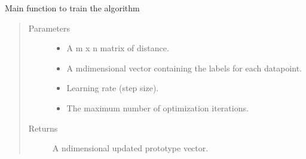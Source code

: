 \documentclass[letterpaper,10pt,english]{sphinxmanual}
\begin{document}
\begin{fulllineitems}
\begin{fulllineitems}
\begin{quote}
\begin{description}
\end{description}\end{quote}

\end{fulllineitems}


\begin{fulllineitems}
\label{\detokenize{Renyi_final:Renyi_final.GLVQ.do_processing}}
\sphinxAtStartPar
Main function to train the algorithm
\begin{quote}\begin{description}
\item[{Parameters}] \leavevmode\begin{itemize}
\item {} 
\sphinxAtStartPar
{} \textendash{} A m x n matrix of distance.

\item {} 
\sphinxAtStartPar
{} \textendash{} A m\sphinxhyphen{}dimensional vector containing the labels for each datapoint.

\item {} 
\sphinxAtStartPar
{} \textendash{} Learning rate (step size).

\item {} 
\sphinxAtStartPar
{} \textendash{} The maximum number of optimization iterations.

\end{itemize}

\item[{Returns}] \leavevmode
\sphinxAtStartPar
A n\sphinxhyphen{}dimensional updated prototype vector.

\end{description}\end{quote}

\end{fulllineitems}



\end{fulllineitems}
\end{document}
